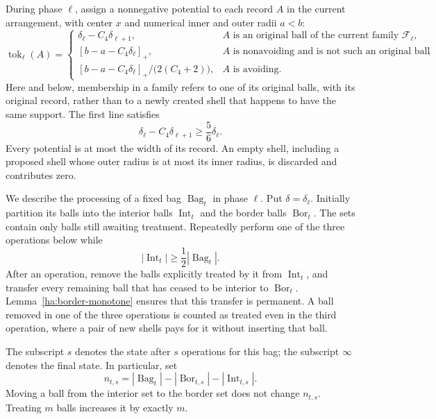 \documentclass[11pt]{amsart}
\theoremstyle{definition}
\theoremstyle{remark}
\numberwithin{equation}{section}
\begin{document}
During phase $\ell$, assign a nonnegative potential to each record
$A$ in the current arrangement, with center $x$ and numerical inner
and outer radii $a<b$:
\begin{equation}
 \operatorname{tok}_\ell(A)=
 \begin{cases}
  \delta_\ell-C_4\delta_{\ell+1},
   &A\text{ is an original ball of the current family }\mathcal F_\ell,\\
  [b-a-C_4\delta_\ell]_+,
   &A\text{ is nonavoiding and is not such an original ball},\\
  [b-a-C_4\delta_\ell]_+/\bigl(2(C_4+2)\bigr),
   &A\text{ is avoiding}.
 \end{cases}
 \label{ha:potential}
\end{equation}
Here and below, membership in a family refers to one of its original
balls, with its original record, rather than to a newly created shell
that happens to have the same support.  The first line satisfies
\begin{equation}
 \delta_\ell-C_4\delta_{\ell+1}\geq\frac56\delta_\ell.
 \label{ha:fresh-potential}
\end{equation}
Every potential is at most the width of its record.  An empty shell,
including a proposed shell whose outer radius is at most its inner
radius, is discarded and contributes zero.

We describe the processing of a fixed bag $\operatorname{Bag}_t$ in
phase $\ell$.  Put $\delta=\delta_\ell$.  Initially partition its balls
into the interior balls $\operatorname{Int}_t$ and the border balls
$\operatorname{Bor}_t$.  The sets contain only balls still awaiting
treatment.  Repeatedly perform one of the three operations below while
\begin{equation}
 |\operatorname{Int}_t|\geq\frac12|\operatorname{Bag}_t|.
 \label{ha:interior-loop}
\end{equation}
After an operation, remove the balls explicitly treated by it from
$\operatorname{Int}_t$, and transfer every remaining ball that has
ceased to be interior to $\operatorname{Bor}_t$.  Lemma~\ref{ha:border-monotone}
ensures that this transfer is permanent.  A ball removed in one of the
three operations is counted as treated even in the third operation,
where a pair of new shells pays for it without inserting that ball.

The subscript $s$ denotes the state after $s$ operations for this bag;
the subscript $\infty$ denotes the final state.  In particular, set
\[
 n_{t,s}=|\operatorname{Bag}_t|
          -|\operatorname{Bor}_{t,s}|-|\operatorname{Int}_{t,s}|.
\]
Moving a ball from the interior set to the border set does not change
$n_{t,s}$.  Treating $m$ balls increases it by exactly $m$.
\end{document}
